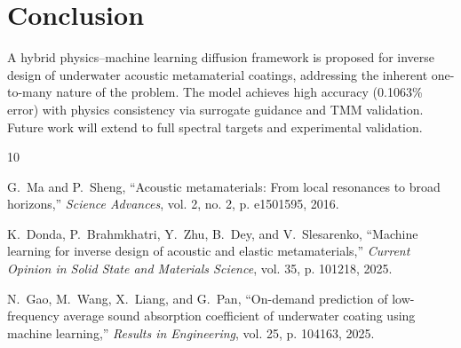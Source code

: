 \documentclass[conference]{IEEEtran}
\begin{document}
\section{Conclusion}
A hybrid physics–machine learning diffusion framework is proposed for inverse design of underwater acoustic metamaterial coatings, addressing the inherent one-to-many nature of the problem. The model achieves high accuracy (0.1063\% error) with physics consistency via surrogate guidance and TMM validation. Future work will extend to full spectral targets and experimental validation.


\begin{thebibliography}{10}

G.~Ma and P.~Sheng, ``Acoustic metamaterials: From local resonances to broad horizons,'' \textit{Science Advances}, vol. 2, no. 2, p. e1501595, 2016.

K.~Donda, P.~Brahmkhatri, Y.~Zhu, B.~Dey, and V.~Slesarenko, ``Machine learning for inverse design of acoustic and elastic metamaterials,'' \textit{Current Opinion in Solid State and Materials Science}, vol. 35, p. 101218, 2025.


N.~Gao, M.~Wang, X.~Liang, and G.~Pan, ``On-demand prediction of low-frequency average sound absorption coefficient of underwater coating using machine learning,'' \textit{Results in Engineering}, vol. 25, p. 104163, 2025.








\end{thebibliography}
\end{document}
